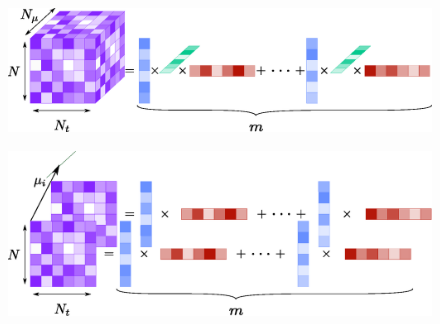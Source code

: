 \documentclass[aspectratio=1610]{beamer}
\begin{document}
\begin{frame}
\begin{minipage}{0.53\linewidth}
		\end{minipage}
		\hfill
		\begin{minipage}{0.45\linewidth}
			\begin{overprint}
				\vspace{7pt}
				\begin{figure}
					\centering
					\includegraphics[width=\linewidth]{Figures/PGD_Method_Matrix_3D.eps}
				\end{figure}
				\vfill \vspace{30pt}
				\begin{figure}
					\centering
					\includegraphics[width=\linewidth]{Figures/PGD_Method_Matrix_2D_2.eps}
				\end{figure}
			\end{overprint}
		\end{minipage}
	\end{frame}
	
	
	
	
	
\end{document}
